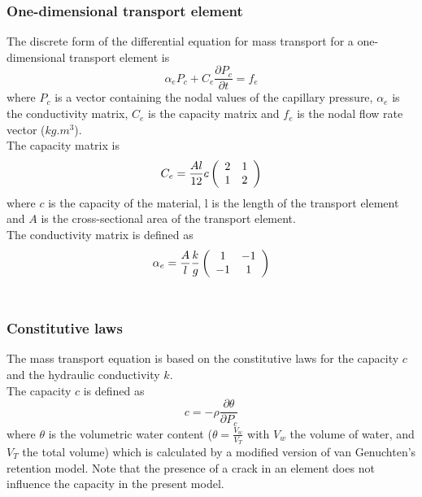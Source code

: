 \documentclass[a4paper]{article}
\begin{document}
\subsubsection{One-dimensional transport element}
The discrete form of the differential equation for mass transport for a one-dimensional transport element is
\begin{equation}\label{latticetransmat3}
\alpha_{e}P_{c} + C_{e}\frac{\partial P_{c}}{\partial t}  = f_{e}
\end{equation}
where $P_{c}$ is a vector containing the nodal values of the capillary pressure, $\alpha_{e}$ is the conductivity matrix, $C_{e}$ is the capacity matrix and $f_{e}$ is the nodal flow rate vector ($kg.m^{3}$). \\

The capacity matrix is
\begin{equation}\label{latticetransmat4}
 C_{e} = \frac{Al}{12}c \left(  \begin{array}{ c c }  2 & 1 \\  1 & 2 \end{array}  \right)
\end{equation}
where $c$ is the capacity of the material, l is the length of the transport element and $A$ is the cross-sectional area of the transport element. \\

The conductivity matrix is defined as
\begin{equation}\label{latticetransmat5}
 \alpha_{e} = \frac{A}{l}\frac{k}{g} \left(  \begin{array}{ c c }  1 & -1 \\  -1 & 1 \end{array}  \right)
\end{equation}
\\

\subsubsection{Constitutive laws}
The mass transport equation is based on the constitutive laws for the capacity $c$ and the hydraulic conductivity $k$.\\

The capacity $c$ is defined as 
\begin{equation}\label{latticetransmat6}
c=-\rho\frac{\partial \theta}{\partial P_{c}}
\end{equation}
where $\theta$ is the volumetric water content ($\theta=\frac{V_{w}}{V_{T}}$ with $V_{w}$ the volume of water, and $V_{T}$ the total volume) which is calculated by a modified version of van Genuchten’s retention model. Note that the presence of a crack in an element does not influence the capacity in the present model.\\
\end{document}
